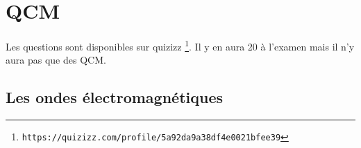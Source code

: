 \documentclass[a4paper]{article}
\begin{document}








































\section{QCM}





Les questions sont disponibles sur quizizz \footnote{\texttt{https://quizizz.com/profile/5a92da9a38df4e0021bfee39}}. Il y en aura 20 à l'examen mais il n'y aura pas que des QCM.










\subsection{Les ondes électromagnétiques}
\end{document}

